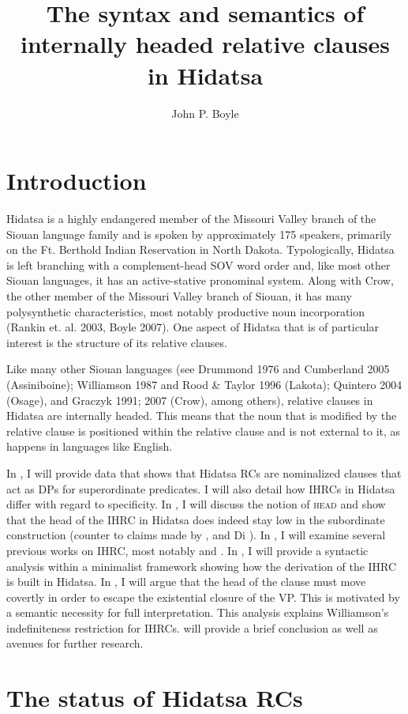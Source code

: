 \documentclass[output=paper]{LSP/langsci}
\author{John P. Boyle}
\title{The syntax and semantics of internally headed relative clauses in Hidatsa}
\begin{document}
\section{Introduction}  

Hidatsa is a highly endangered member of the Missouri Valley branch of the Siouan language family and is spoken by approximately 175 speakers, primarily on the Ft. Berthold Indian Reservation in North Dakota. Typologically, Hidatsa is left branching with a complement-head SOV word order and, like most other Siouan languages, it has an active-stative pronominal system. Along with Crow, the other member of the Missouri Valley branch of Siouan, it has many polysynthetic characteristics, most notably productive noun incorporation (Rankin et. al. 2003, Boyle 2007). One aspect of Hidatsa that is of particular interest is the structure of its relative clauses.
	
Like many other Siouan languages (see Drummond 1976 and Cumberland 2005 (Assiniboine); Williamson 1987 and Rood \& Taylor 1996 (Lakota); Quintero 2004 (Osage), and Graczyk 1991; 2007 (Crow), among others), relative clauses in Hidatsa are internally headed. This means that the noun that is modified by the relative clause is positioned within the relative clause and is not external to it, as happens in languages like English.
	
In , I will provide data that shows that Hidatsa RCs are nominalized clauses that act as DPs for superordinate predicates. I will also detail how IHRCs in Hidatsa differ with regard to specificity. In , I will discuss the notion of \textsc{head} and show that the head of the IHRC in Hidatsa does indeed stay low in the subordinate construction (counter to claims made by \citet{Kayne1994}, \citet{Bianchi1999} and Di \citet{Sciullo2005}). In , I will examine several previous works on IHRC, most notably \citet{Williamson1987} and \citet{Culy1990}. In , I will provide a syntactic analysis within a minimalist framework showing how the derivation of the IHRC is built in Hidatsa. In , I will argue that the head of the clause must move covertly in order to escape the existential closure of the VP. This is motivated by a semantic necessity for full interpretation. This analysis explains Williamson's indefiniteness restriction for IHRCs.  will provide a brief conclusion as well as avenues for further research.

\section{The status of Hidatsa RCs}
\end{document}
